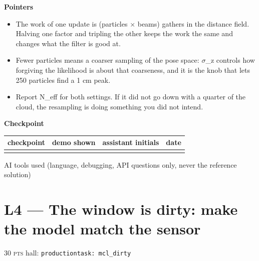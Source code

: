 \documentclass[a4paper,10pt]{article}
\newcommand{\pts}[1]{\textsc{#1 pts}}
\begin{document}
\vspace{4pt}\noindent\textbf{Pointers}

\begin{itemize}\itemsep1pt

\item The work of one update is (particles \(\times\) beams) gathers in the distance field. Halving one factor and tripling the other keeps the work the same and changes what the filter is good at.

\item Fewer particles means a coarser sampling of the pose space: \(\sigma\)\_z controls how forgiving the likelihood is about that coarseness, and it is the knob that lets 250 particles find a 1 cm peak.

\item Report N\_eff for both settings. If it did not go down with a quarter of the cloud, the resampling is doing something you did not intend.

\end{itemize}

\vspace{4pt}\noindent\textbf{Checkpoint}

\begin{tabular}{|>{\raggedright\hyphenpenalty 500\arraybackslash}p{4.87cm}|>{\raggedright\hyphenpenalty 500\arraybackslash}p{2.80cm}|>{\raggedright\hyphenpenalty 500\arraybackslash}p{4.48cm}|>{\raggedright\hyphenpenalty 500\arraybackslash}p{2.34cm}|}
\hline
\textbf{checkpoint} & \textbf{demo shown} & \textbf{assistant initials} & \textbf{date} \\
\hline
\rule{0pt}{2.4em} & \rule{0pt}{2.4em} & \rule{0pt}{2.4em} & \rule{0pt}{2.4em} \\
\hline
\end{tabular}

\vspace{2pt}\noindent AI tools used (language, debugging, API questions only, never the reference solution)\hrulefill

\newpage

\section{L4 --- The window is dirty: make the model match the sensor}

\noindent\hfill\pts{30}\hspace{1em} hall: \texttt{production}\hspace{1em}\texttt{task: mcl\_dirty}
\end{document}
